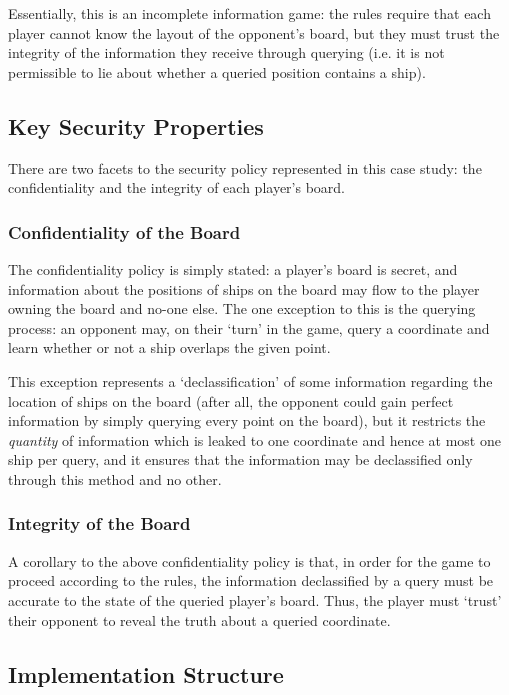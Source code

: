 Essentially, this is an incomplete information game: the rules require that each player cannot know the layout of the opponent's board, but they must trust the integrity of the information they receive through querying (i.e. it is not permissible to lie about whether a queried position contains a ship).

\newpage

\subsection{Key Security Properties}

There are two facets to the security policy represented in this case study: the confidentiality and the integrity of each player's board.

\subsubsection{Confidentiality of the Board}

The confidentiality policy is simply stated: a player's board is secret, and information about the positions of ships on the board may flow to the player owning the board and no-one else. The one exception to this is the querying process: an opponent may, on their `turn' in the game, query a coordinate and learn whether or not a ship overlaps the given point.

This exception represents a `declassification' of some information regarding the location of ships on the board (after all, the opponent could gain perfect information by simply querying every point on the board), but it restricts the \textit{quantity} of information which is leaked to one coordinate and hence at most one ship per query, and it ensures that the information may be declassified only through this method and no other.

\subsubsection{Integrity of the Board}

A corollary to the above confidentiality policy is that, in order for the game to proceed according to the rules, the information declassified by a query must be accurate to the state of the queried player's board. Thus, the player must `trust' their opponent to reveal the truth about a queried coordinate.

\subsection{Implementation Structure}\label{battleships_impstructure}

